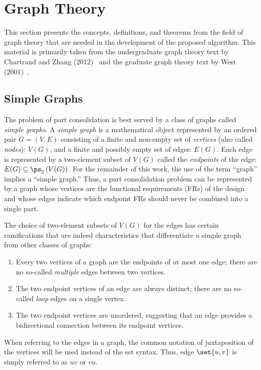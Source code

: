 \section{Graph Theory}\label{sec:theory}

This section presents the concepts, definitions, and theorems from the field of graph theory that are needed in the
development of the proposed algorithm.  This material is primarily taken from the undergraduate graph theory text
by Chartrand and Zhang (2012)~\cite{chartrand} and the graduate graph theory text by West (2001)~\cite{west}.

\subsection{Simple Graphs}\label{sec:sub:simple}

The problem of part consolidation is best served by a class of graphs called \emph{simple graphs}.  A \emph{simple
  graph} is a mathematical object represented by an ordered pair \(G=(V,E)\) consisting of a finite and non-empty
set of \emph{vertices} (also called \emph{nodes}): \(V(G)\), and a finite and possibly empty set of edges:
\(E(G)\).  Each edge is represented by a two-element subset of \(V(G)\) called the \emph{endpoints} of the edge:
\(E(G)\subseteq\ps_2\left(V(G)\right)\).  For the remainder of this work, the use of the term ``graph'' implies a
``simple graph.''  Thus, a part consolidation problem can be represented by a graph whose vertices are the
functional requirements (FRs) of the design and whose edges indicate which endpoint FRs should never be combined
into a single part.

The choice of two-element subsets of \(V(G)\) for the edges has certain ramifications that are indeed characteristics
that differentiate a simple graph from other classes of graphs:
\begin{enumerate}
\item Every two vertices of a graph are the endpoints of at most one edge; there are no so-called
  \emph{multiple} edges between two vertices.
\item The two endpoint vertices of an edge are always distinct; there are no so-called \emph{loop} edges on a
  single vertex.
\item The two endpoint vertices are unordered, suggesting that an edge provides a bidirectional connection between
  its endpoint vertices.
\end{enumerate}
When referring to the edges in a graph, the common notation of juxtaposition of the vertices will be used instead of
the set syntax.  Thus, edge \(\set{u,v}\) is simply referred to as \(uv\) or \(vu\).

